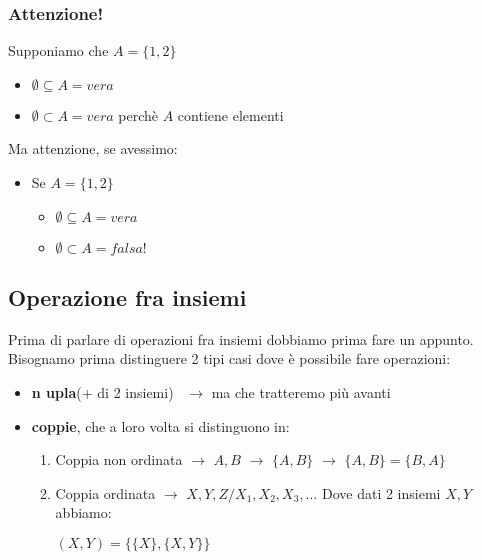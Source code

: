 \documentclass[article,12pt]{book}
\begin{document}
\begin{enumerate}
\subsubsection{Attenzione!}
Supponiamo che \(A = \{1,2\} \)
    \begin{itemize}
        \item \(\emptyset \subseteq A = vera \)
        \item \(\emptyset \subset  A = vera \) perchè $A$ contiene elementi
    \end{itemize}    
Ma attenzione, se avessimo:
    \begin{itemize}
        \item Se $A = \{1,2\}$
    \begin{center}
        \begin{itemize}
            \item \(\emptyset \subseteq A = vera\)
            \item \(\emptyset \subset A = falsa !\)
        \end{itemize}
    \end{center}
    \end{itemize}

\subsection{Operazione fra insiemi}
Prima di parlare di operazioni fra insiemi dobbiamo prima fare un appunto.
Bisognamo prima distinguere 2 tipi casi dove è possibile fare operazioni:
    \begin{itemize}
        \item \textbf{n upla}(+ di 2 insiemi) \ \(\rightarrow\) ma che tratteremo più avanti
        \item \textbf{coppie}, che a loro volta si distinguono in:
    \begin{center}
        \begin{enumerate}
            \item Coppia non ordinata \(\rightarrow\) $A, B$ \(\rightarrow \) $\{A,B\}$ \(\rightarrow\) $\{A,B\} = \{B,A\}$
            \item Coppia ordinata \(\rightarrow\) $X,Y,Z / X_1, X_2, X_3, \ldots$
            Dove dati 2 insiemi $X,Y$ abbiamo: \\[2ex]
            \begin{center}
                \((X,Y) = \{\{X\},\{X,Y\}\}\)
            \end{center}
            

\end{enumerate}
\end{center}
\end{itemize}
\end{enumerate}
\end{document}
